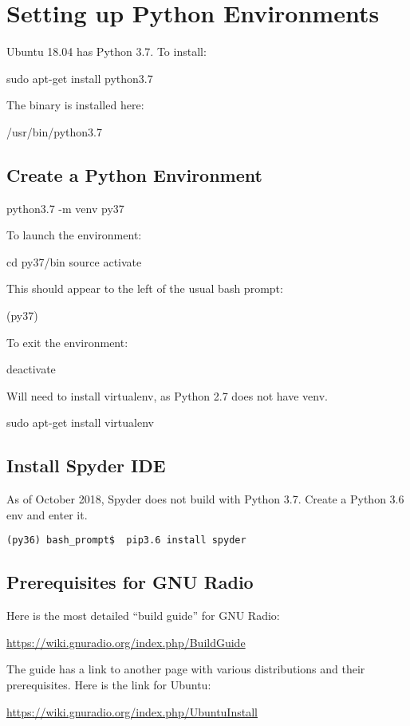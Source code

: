\chapter{Setting up Python Environments}

Ubuntu 18.04 has Python 3.7.  To install:

sudo apt-get install python3.7

The binary is installed here:

/usr/bin/python3.7

\section{Create a Python Environment}

python3.7 -m venv py37

To launch the environment:

cd py37/bin
source activate

This should appear to the left of the usual bash prompt:

(py37)

To exit the environment:

deactivate

Will need to install virtualenv, as Python 2.7 does not have venv.

sudo apt-get install virtualenv

\section{Install Spyder IDE}

As of October 2018, Spyder does not build with Python 3.7.
Create a Python 3.6 env and enter it.

\begin{verbatim}
(py36) bash_prompt$  pip3.6 install spyder
\end{verbatim}

\section{Prerequisites for GNU Radio}

Here is the most detailed ``build guide'' for GNU Radio:

\url{https://wiki.gnuradio.org/index.php/BuildGuide}

The guide has a link to another page with various distributions and their prerequisites.
Here is the link for Ubuntu:

\url{https://wiki.gnuradio.org/index.php/UbuntuInstall}

